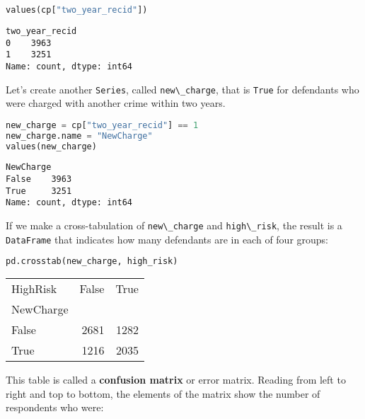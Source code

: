 \begin{lstlisting}[language=Python,style=source]
values(cp["two_year_recid"])
\end{lstlisting}

\begin{lstlisting}[style=output]
two_year_recid
0    3963
1    3251
Name: count, dtype: int64
\end{lstlisting}

Let's create another \passthrough{\lstinline!Series!}, called
\passthrough{\lstinline!new\_charge!}, that is
\passthrough{\lstinline!True!} for defendants who were charged with
another crime within two years.

\begin{lstlisting}[language=Python,style=source]
new_charge = cp["two_year_recid"] == 1
new_charge.name = "NewCharge"
values(new_charge)
\end{lstlisting}

\begin{lstlisting}[style=output]
NewCharge
False    3963
True     3251
Name: count, dtype: int64
\end{lstlisting}

If we make a cross-tabulation of \passthrough{\lstinline!new\_charge!}
and \passthrough{\lstinline!high\_risk!}, the result is a
\passthrough{\lstinline!DataFrame!} that indicates how many defendants
are in each of four groups:

\begin{lstlisting}[language=Python,style=source]
pd.crosstab(new_charge, high_risk)
\end{lstlisting}

\begin{tabular}{lrr}
\toprule
HighRisk & False & True \\
NewCharge &  &  \\
\midrule
False & 2681 & 1282 \\
True & 1216 & 2035 \\
\bottomrule
\end{tabular}

This table is called a \textbf{confusion matrix} or error matrix.
Reading from left to right and top to bottom, the elements of the matrix
show the number of respondents who were:

